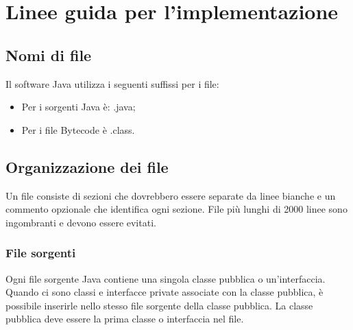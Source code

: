 \chapter{Linee guida per l'implementazione}

\section{Nomi di file}
Il software Java utilizza i seguenti suffissi per i file:
\begin{itemize}
  \item Per i sorgenti Java è: .java;
  \item Per i file Bytecode è .class.
\end{itemize}

\section{Organizzazione dei file}
Un file consiste di sezioni che dovrebbero essere separate da linee bianche e un commento opzionale che identifica ogni sezione. File più lunghi di 2000 linee sono ingombranti e devono essere evitati.

\subsection{File sorgenti}
Ogni file sorgente Java contiene una singola classe pubblica o un’interfaccia. Quando ci sono classi e interfacce private associate con la classe pubblica, è possibile inserirle nello stesso file sorgente della classe pubblica. La classe pubblica deve essere la prima classe o interfaccia nel file.

